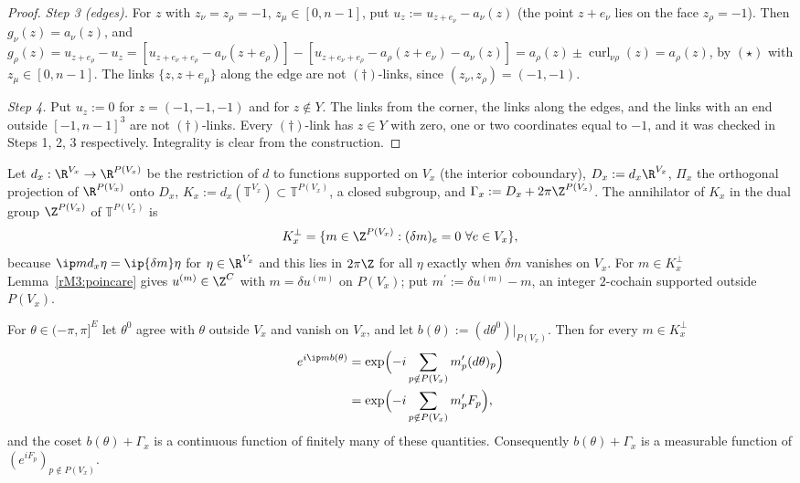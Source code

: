 \begin{proof}
\emph{Step 3 (edges).} For $z$ with $z_\nu=z_\rho=-1$, $z_\mu\in[0,n-1]$,
put $u_z:=u_{z+e_\nu}-a_\nu(z)$ (the point $z+e_\nu$ lies on the face
$z_\rho=-1$). Then $g_\nu(z)=a_\nu(z)$, and
$g_\rho(z)=u_{z+e_\rho}-u_z=[u_{z+e_\nu+e_\rho}-a_\nu(z+e_\rho)]-[u_{z+e_\nu
+e_\rho}-a_\rho(z+e_\nu)-a_\nu(z)]=a_\rho(z)\pm\operatorname{curl}_{\nu\rho}
(z)=a_\rho(z)$, by $(\star)$ with $z_\mu\in[0,n-1]$. The links
$\{z,z+e_\mu\}$ along the edge are not $(\dagger)$-links, since
$(z_\nu,z_\rho)=(-1,-1)$.

\emph{Step 4.} Put $u_z:=0$ for $z=(-1,-1,-1)$ and for $z\notin Y$. The
links from the corner, the links along the edges, and the links with an
end outside $[-1,n-1]^3$ are not $(\dagger)$-links. Every $(\dagger)$-link
has $z\in Y$ with zero, one or two coordinates equal to $-1$, and it was
checked in Steps 1, 2, 3 respectively. Integrality is clear from the
construction.
\end{proof}

Let $d_x:\R^{V_x}\to\R^{P(V_x)}$ be the restriction of $d$ to functions
supported on $V_x$ (the interior coboundary), $D_x:=d_x\R^{V_x}$, $\Pi_x$ the
orthogonal projection of $\R^{P(V_x)}$ onto $D_x$, $K_x:=d_x(\mathbb T^{V_x})
\subset\mathbb T^{P(V_x)}$, a closed subgroup, and $\Gamma_x:=D_x+2\pi\Z^{P
(V_x)}$. The annihilator of $K_x$ in the dual group $\Z^{P(V_x)}$ of
$\mathbb T^{P(V_x)}$ is
\[
K_x^\perp=\{m\in\Z^{P(V_x)}:(\delta m)_e=0\ \forall e\in V_x\},
\]
because $\ip m{d_x\eta}=\ip{\delta m}\eta$ for $\eta\in\R^{V_x}$ and this
lies in $2\pi\Z$ for all $\eta$ exactly when $\delta m$ vanishes on $V_x$.
For $m\in K_x^\perp$ Lemma~\ref{rM3:poincare} gives $u^{(m)}\in\Z^C$ with
$m=\delta u^{(m)}$ on $P(V_x)$; put $m^{\prime}:=\delta u^{(m)}-m$, an
integer $2$-cochain supported outside $P(V_x)$.

\begin{lemma}\label{rM3:coset}
For $\theta\in(-\pi,\pi]^E$ let $\theta^0$ agree with $\theta$ outside
$V_x$ and vanish on $V_x$, and let $b(\theta):=(d\theta^0)|_{P(V_x)}$. Then
for every $m\in K_x^\perp$
\begin{align*}
e^{i\ip m{b(\theta)}}&=\exp\Bigl(-i\sum_{p\notin P(V_x)}m'_p(d\theta)_p
\Bigr)\\
&=\exp\Bigl(-i\sum_{p\notin P(V_x)}m'_pF_p\Bigr),
\end{align*}
and the coset $b(\theta)+\Gamma_x$ is a continuous function of finitely
many of these quantities. Consequently $b(\theta)+\Gamma_x$ is a
measurable function of $(e^{iF_p})_{p\notin P(V_x)}$.
\end{lemma}

